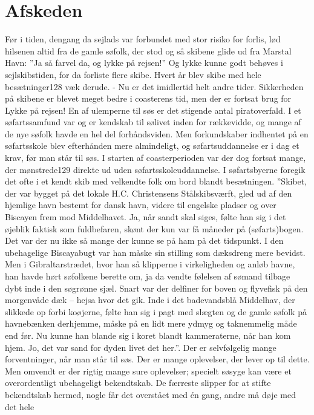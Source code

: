 \chapter{Afskeden}

Før i tiden, dengang da sejlads var forbundet med stor risiko for
forlis, lød hilsenen altid fra de gamle søfolk, der stod og så skibene
glide ud fra Marstal Havn: ''Ja så farvel da, og lykke på rejsen!'' Og
lykke kunne godt behøves i sejlskibstiden, for da forliste flere skibe.
Hvert år blev skibe med hele besætninger128 væk derude. - Nu er det
imidlertid helt andre tider. Sikkerheden på skibene er blevet meget
bedre i coasterens tid, men der er fortsat brug for Lykke på rejsen! En
af ulemperne til søs er det stigende antal piratoverfald. I et
søfartssamfund var og er kendskab til sølivet inden for rækkevidde, og
mange af de nye søfolk havde en hel del forhåndsviden. Men forkundskaber
indhentet på en søfartsskole blev efterhånden mere almindeligt, og
søfartsuddannelse er i dag et krav, før man står til søs. I starten af
coasterperioden var der dog fortsat mange, der mønstrede129 direkte ud
uden søfartsskoleuddannelse. I søfartsbyerne foregik det ofte i et kendt
skib med velkendte folk om bord blandt besætningen. ''Skibet, der var
bygget på det lokale H.C. Christensens Stålskibsværft, gled ud af den
hjemlige havn bestemt for dansk havn, videre til engelske pladser og
over Biscayen frem mod Middelhavet. Ja, når sandt skal siges, følte han
sig i det øjeblik faktisk som fuldbefaren, skønt der kun var få måneder
på (søfarts)bogen. Det var der nu ikke så mange der kunne se på ham på
det tidspunkt. I den ubehagelige Biscayabugt var han måske sin stilling
som dæksdreng mere bevidst. Men i Gibraltarstrædet, hvor han så
klipperne i virkeligheden og anløb havne, han havde hørt søfolkene
berette om, ja da vendte følelsen af sømand tilbage dybt inde i den
søgrønne sjæl. Snart var der delfiner for boven og flyvefisk på den
morgenvåde dæk -- hejsa hvor det gik. Inde i det badevandsblå Middelhav,
der slikkede op forbi koøjerne, følte han sig i pagt med slægten og de
gamle søfolk på havnebænken derhjemme, måske på en lidt mere ydmyg og
taknemmelig måde end før. Nu kunne han blande sig i koret blandt
kammeraterne, når han kom hjem. Jo, det var sand for dyden livet det
her.''. Der er selvfølgelig mange forventninger, når man står til søs.
Der er mange oplevelser, der lever op til dette. Men omvendt er der
rigtig mange sure oplevelser; specielt søsyge kan være et overordentligt
ubehageligt bekendtskab. De færreste slipper for at stifte bekendtskab
hermed, nogle får det overstået med én gang, andre må døje med det hele
